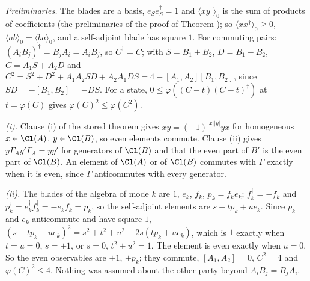 \emph{Preliminaries.} The blades are a basis, $e_{S}e_{S}^{\dagger} = 1$ and $\langle xy^{\dagger}\rangle_{0}$ is the sum of products of coefficients (the preliminaries of the proof of Theorem ); so $\langle xx^{\dagger}\rangle_{0} \ge 0$, $\langle ab\rangle_{0} = \langle ba\rangle_{0}$, and a self-adjoint blade has square $1$. For commuting pairs: $(A_{i}B_{j})^{\dagger} = B_{j}A_{i} = A_{i}B_{j}$, so $C^{\dagger} = C$; with $S = B_{1} + B_{2}$, $D = B_{1} - B_{2}$, $C = A_{1}S + A_{2}D$ and $C^{2} = S^{2} + D^{2} + A_{1}A_{2}SD + A_{2}A_{1}DS = 4 - [A_{1},A_{2}][B_{1},B_{2}]$, since $SD = -[B_{1},B_{2}] = -DS$. For a state, $0 \le \varphi((C - t)(C - t)^{\dagger})$ at $t = \varphi(C)$ gives $\varphi(C)^{2} \le \varphi(C^{2})$.

\emph{(i).} Clause (i) of the stored theorem gives $xy = (-1)^{|x||y|}yx$ for homogeneous $x \in \Cl(A)$, $y \in \Cl(B)$, so even elements commute. Clause (ii) gives $y\Gamma_{A}y'\Gamma_{A} = yy'$ for generators of $\Cl(B)$ and that the even part of $B'$ is the even part of $\Cl(B)$. An element of $\Cl(A)$ or of $\Cl(B)$ commutes with $\Gamma$ exactly when it is even, since $\Gamma$ anticommutes with every generator.

\emph{(ii).} The blades of the algebra of mode $k$ are $1$, $e_{k}$, $f_{k}$, $p_{k} = f_{k}e_{k}$; $f_{k}^{\dagger} = -f_{k}$ and $p_{k}^{\dagger} = e_{k}^{\dagger}f_{k}^{\dagger} = -e_{k}f_{k} = p_{k}$, so the self-adjoint elements are $s + tp_{k} + ue_{k}$. Since $p_{k}$ and $e_{k}$ anticommute and have square $1$, $(s + tp_{k} + ue_{k})^{2} = s^{2} + t^{2} + u^{2} + 2s(tp_{k} + ue_{k})$, which is $1$ exactly when $t = u = 0$, $s = \pm 1$, or $s = 0$, $t^{2} + u^{2} = 1$. The element is even exactly when $u = 0$. So the even observables are $\pm 1$, $\pm p_{k}$; they commute, $[A_{1},A_{2}] = 0$, $C^{2} = 4$ and $\varphi(C)^{2} \le 4$. Nothing was assumed about the other party beyond $A_{i}B_{j} = B_{j}A_{i}$.

